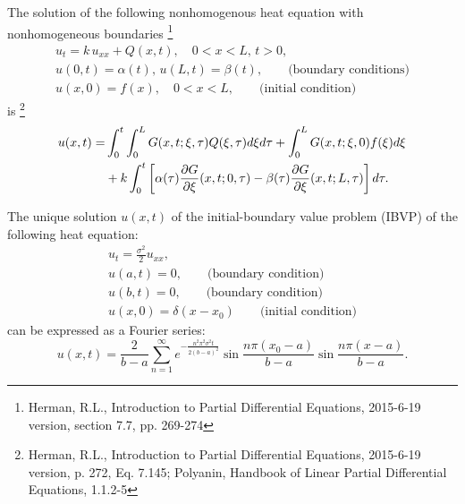 The solution of the following nonhomogenous heat equation with nonhomogeneous
boundaries
\footnote{Herman, R.L., Introduction to Partial Differential Equations,
2015-6-19 version, section 7.7, pp. 269-274}
\begin{gather*}
	u_t = k\, u_{xx} + Q(x,t),  \quad 0<x<L, \, t>0,   \\
	u(0,t) = \alpha(t), \, u(L,t)=\beta(t), \qquad \text{(boundary conditions)} \\
	u(x,0) = f(x), \quad 0<x<L, \qquad \text{(initial condition)}
\end{gather*}
is
\footnote{Herman, R.L., Introduction to Partial Differential Equations,
2015-6-19 version, p. 272, Eq. 7.145; Polyanin, Handbook of Linear Partial
Differential Equations, 1.1.2-5}
\begin{align}
	u(x,t) 
	  =& \int_0^t \int_0^L G(x,t;\xi,\tau) Q(\xi,\tau) d\xi d\tau
	     + \int_0^L G(x,t;\xi,0) f(\xi) d\xi  \notag \\
		&+ k\int_0^t 
		  \left[
				\alpha(\tau) \frac{\partial G}{\partial\xi}(x,t; 0,\tau)
				-\beta(\tau) \frac{\partial G}{\partial\xi}(x,t; L,\tau)
			\right] d\tau.
\end{align}


The unique solution $u(x,t)$ of the 
initial-boundary value problem (IBVP) of the following heat equation:
\begin{gather*}
	u_t = \frac{\sigma^2}{2} u_{xx},   \\
	u(a,t)=0,              \qquad \text{(boundary condition)}     \\
	u(b,t)=0,              \qquad \text{(boundary condition)}     \\
	u(x,0) = \delta(x-x_0) \qquad \text{(initial condition)}
\end{gather*}
can be expressed as a Fourier series:
\begin{equation}
	u(x,t) = 
	  \frac{2}{b-a} 
		\sum_{n=1}^{\infty} e^{-\frac{n^2\pi^2 \sigma^2 t}{2(b-a)^2}}
			\sin \frac{n\pi (x_0-a)}{b-a} \sin \frac{n\pi (x-a)}{b-a}.
\end{equation}

